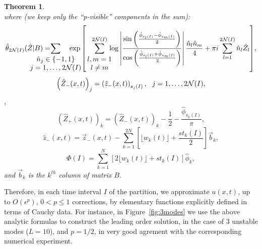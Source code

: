 \documentclass[12pt]{article}
\newtheorem{theorem}{Theorem}
\newcommand{\beq}{\begin{equation}}
\newcommand{\eeq}{\end{equation}}
\begin{document}
\begin{theorem}
\begin{equation}
\end{equation}
where (we keep only the ``p-visible'' components in the sum):
\begin{equation}
\label{eq:theta-hyper3}
\hat\theta_{2{\cal N}(I)}(\hat Z|B) = \!\!\!\!\!\!\!\!\!\!\!\!\!\!\!\!\!\!\!\!\!\!  \sum\limits_{\begin{array}{c}\hat n_j\in\{-1,1\}\\ j=1,\ldots,2{\cal N}(I)\end{array}}\!\!\!\!\!\!\!\!\!\!\!\!\!\!
\exp{\left[\!\! \sum\limits_{\begin{array}{c}l,m=1 \\ l\ne m\end{array}}^{2{\cal N}(I)}\!\!\!\!\!\! 
\log \left|\frac{\sin\left(\frac{\hat\phi_{s_l(I)}-\hat\phi_{s_m(I)}}{2} \right)}{\cos\left(\frac{\hat\phi_{s_l(I)}+\hat\phi_{s_m(I)}}{2} \right) }\right| \frac{\hat n_l\hat n_m}{4} +  \pi i \sum\limits_{l=1}^{2{\cal N}(I)}  \hat n_l \hat Z_l\right]},
\end{equation}
$$
\left(\hat Z_{-}(x,t)\right)_j = \left(\hat z_{-}(x,t)\right)_{s_j(I)}, \ \ j=1,\ldots, 2{\cal N}(I),$$ 
,
$$
(\hat Z_{+}(x,t))_k = (\hat Z_{-}(x,t))_k - \frac{1}{2} -\frac{\hat\phi_{s_k(I)}}{\pi}, 
$$
$$
\hat z_{-}(x,t) = \vec z_{-} (x,t) - \sum\limits_{k=1}^{2N} \left[\lfloor w_k(t) \rfloor +\frac{st_k(I)}{2} \right] \vec b_k ,
$$
\beq\label{phases}
\Phi(I) = \sum\limits_{k=1}^{N} \left[ 2\lfloor w_k(t) \rfloor + st_k(I) \right] \hat\phi_k , 
\eeq
and $\vec b_k$ is the $k^{th}$ column of matrix $B$.
\end{theorem}
Therefore, in each time interval $I$ of the partition, we approximate $u(x,t)$, up to $O(\epsilon^p)$, $0< p \le 1$ corrections, by elementary functions explicitly defined in terms of Cauchy data. For instance, in Figure~\ref{fig:3modes} we use the above analytic formulas to construct the leading order solution, in the case of 3 unstable modes ($L=10$), and $p=1/2$, in very good agrement with the corresponding numerical experiment.
\end{document}
